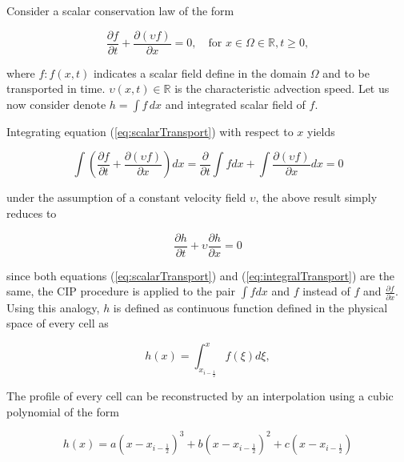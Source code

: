 \documentclass[10pt,a4paper]{article}
\newcommand{\pd}[2]{\frac{\partial #1}{\partial #2}}
\begin{document}
Consider a scalar conservation law of the form
%
\begin{linenomath}
\begin{equation}
	\pd{f}{t} + \pd{(\upsilon f)}{x} = 0, 
	\quad\text{for } x\in\Omega\in\mathbb{R},t\geqslant0, 
	\label{eq:scalarTransport2}
\end{equation}
\end{linenomath}
%
where $f:f(x,t)$ indicates a scalar field define in the domain $\Omega$ and to be transported in time. $\upsilon(x,t)\in\mathbb{R}$ is the characteristic advection speed. Let us now consider denote $h=\int f\,dx$ and integrated scalar field of $f$.

Integrating equation (\ref{eq:scalarTransport}) with respect to $x$ yields
%
\begin{linenomath}
\begin{equation}
	\int \left(\pd{f}{t} + \pd{(\upsilon f)}{x}\right) dx = 
	\pd{}{t} \int f dx + 
	\int  \pd{(\upsilon f)}{x} dx = 0
\end{equation}
\end{linenomath}
%
under the assumption of a constant velocity field $\upsilon$, the above result simply reduces to 
%
\begin{linenomath}
\begin{equation}
	\pd{h}{t} + \upsilon \pd{h}{x} = 0
	\label{eq:integralTransport}
\end{equation}
\end{linenomath}
%
since both equations (\ref{eq:scalarTransport}) and (\ref{eq:integralTransport}) are the same, the CIP procedure is applied to the pair $\int f dx$ and $f$ instead of $f$ and $\pd{f}{x}$. Using this analogy,  $h$ is defined as continuous function defined in the physical space of every cell as 
%
\begin{linenomath}
\begin{equation}
	h(x) = \int_{x_{i-\frac{1}{2}}}^{x} f(\xi) d\xi,
\end{equation}
\end{linenomath}
%
The profile of every cell can be reconstructed by an interpolation using a cubic polynomial of the form
%
\begin{linenomath}
\begin{equation}
	h(x) = a \left(x-x_{i-\frac{1}{2}} \right)^3 + 
		   b \left(x-x_{i-\frac{1}{2}} \right)^2 + 
		   c \left(x-x_{i-\frac{1}{2}} \right) 
\end{equation}
\end{linenomath}
\end{document}
